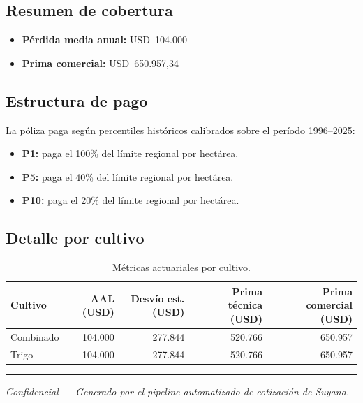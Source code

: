 \documentclass[11pt,a4paper]{article}
\begin{document}
\subsection*{Resumen de cobertura}

\begin{itemize}
  \item \textbf{Pérdida media anual:} USD~104.000
  \item \textbf{Prima comercial:} USD~650.957,34
\end{itemize}

\subsection*{Estructura de pago}

La póliza paga según percentiles históricos calibrados sobre el período 1996--2025:

\begin{itemize}
  \item \textbf{P1:} paga el 100\% del límite regional por hectárea.
  \item \textbf{P5:} paga el 40\% del límite regional por hectárea.
  \item \textbf{P10:} paga el 20\% del límite regional por hectárea.
\end{itemize}

\subsection*{Detalle por cultivo}

\renewcommand{\arraystretch}{1.3}
\begin{table}[ht]
  \centering
  \caption{Métricas actuariales por cultivo.}
  \label{tab:slip_crops}
  \begin{tabular}{lrrrr}
    \toprule
    \textbf{Cultivo} & \textbf{AAL (USD)} & \textbf{Desvío est. (USD)} & \textbf{Prima técnica (USD)} & \textbf{Prima comercial (USD)} \\
    \midrule
    Combinado & 104.000 & 277.844 & 520.766 & 650.957 \\
    Trigo     & 104.000 & 277.844 & 520.766 & 650.957 \\
    \bottomrule
  \end{tabular}
\end{table}

\vspace{1em}
\noindent\rule{\textwidth}{0.4pt}

\vspace{0.5em}
\noindent\textcolor{smidgray}{\small \textit{Confidencial --- Generado por el pipeline automatizado de cotización de Suyana.}}
\end{document}
